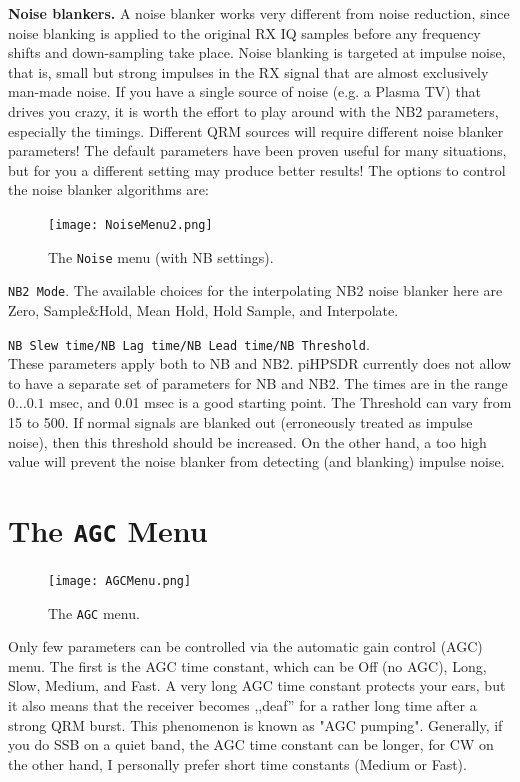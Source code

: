 \documentclass[12pt]{book}
\def\rett#1{\texttt{\color{red}#1}}
\def\bltt#1{\texttt{\color{blue}#1}}
\def\pH{pi\-HPSDR\xspace}
\begin{document}
\textbf{Noise blankers.} A noise blanker works very different from  noise reduction, since noise blanking
is applied to the original RX IQ samples before any frequency shifts and down-sampling take place.
Noise blanking is targeted at impulse noise, that is, small but strong impulses in the RX
signal that are almost exclusively man-made noise.
If you have a single source of noise (e.g. a Plasma TV) that drives you crazy, it is worth
the effort to play around with the NB2 parameters, especially the timings. Different
QRM sources will require different noise blanker parameters! The default parameters have been proven useful
for many situations, but for you a different setting may produce better results!
The options to control the noise blanker algorithms are:

\begin{figure}[ht]
\center
\texttt{[image: NoiseMenu2.png]}
\caption{The \bltt{Noise} menu (with NB settings).}
\label{fig:NoiseMenu2}
\end{figure}
\rett{NB2 Mode}. The available choices for the interpolating NB2 noise blanker here are Zero,
Sample\&Hold, Mean Hold, Hold Sample, and Interpolate.

\rett{NB Slew time/NB Lag time/NB Lead time/NB Threshold}.\\
These parameters apply both to NB and NB2.
\pH currently does not allow to have a separate set of parameters for NB and NB2.
The times are in the range $0\ldots0.1$ msec, and 0.01 msec is a good starting point. The Threshold
can vary from 15 to 500. If normal signals are blanked out (erroneously treated as impulse noise),
then this threshold should be increased. On the other hand, a too high value will prevent the
noise blanker from detecting (and blanking) impulse noise.


\section{The \texttt{AGC} Menu}

\begin{figure}[ht]
\center
\texttt{[image: AGCMenu.png]}
\caption{The \bltt{AGC} menu.}
\label{fig:AGCMenu}
\end{figure}

Only few parameters can be controlled via the automatic gain control (AGC) menu.
The first is the AGC time constant, which can be Off (no AGC), Long, Slow, Medium,
and Fast. A very long AGC time constant protects your ears, but it also means that
the receiver becomes ,,deaf'' for a rather long time after a strong QRM burst. This
phenomenon is known as "AGC pumping". Generally, if you do SSB on a quiet band, the
AGC time constant can be longer, for CW on the other hand, I personally prefer short
time constants (Medium or Fast).
\end{document}
